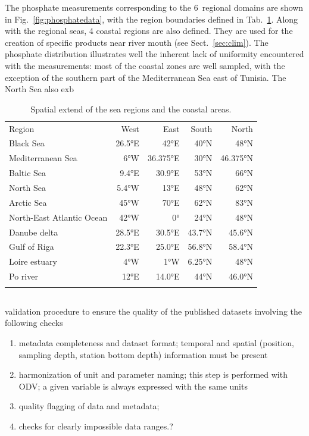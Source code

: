 \documentclass[essd, manuscript]{copernicus}
\begin{document}
The phosphate measurements corresponding to the 6~regional domains are shown in Fig.~\ref{fig:phosphatedata}, with the region boundaries defined in Tab.~\ref{tab:regions}. Along with the regional seas, 4 coastal regions are also defined. They are used for the creation of specific products near river mouth (see Sect.~\ref{sec:clim}). The phosphate distribution illustrates well the inherent lack of uniformity encountered with the measurements: most of the coastal zones are well sampled, with the exception of the southern part of the Mediterranean Sea east of Tunisia. The North Sea also exb 

\begin{table}
\caption{Spatial extend of the sea regions and the coastal areas.\label{tab:regions}}
\begin{tabular}{lrrrr}
\tophline
Region	 					& West		& East		& South 	& North 	\\ 
\middlehline	
Black Sea					& 26.5°E 	& 42°E		& 40°N		& 48°N	 	\\
Mediterranean Sea			& 6°W		& 36.375°E	& 30°N		& 46.375°N	\\
Baltic Sea					& 9.4°E		& 30.9°E	& 53°N		& 66°N		\\
North Sea 					& 5.4°W 	& 13°E		& 48°N		& 62°N		\\
Arctic Sea 					& 45°W 		& 70°E		& 62°N		& 83°N		\\
North-East Atlantic Ocean 	& 42°W		& 0° 		& 24°N		& 48°N		\\
\middlehline	
Danube delta				& 28.5°E	& 30.5°E	& 43.7°N 	& 45.6°N	\\
Gulf of Riga 				& 22.3°E 	& 25.0°E 	& 56.8°N 	& 58.4°N	\\
Loire estuary				& 4°W		& 1°W 		& 6.25°N	& 48°N		\\
Po river					& 12°E		& 14.0°E	& 44°N		& 46.0°N	\\
\bottomhline
\end{tabular}
\end{table}


		

\subsection{}

validation procedure to ensure the quality of the published datasets \citep{Barth2015,Lipizer2021}
involving the following checks
\begin{enumerate}
\item metadata completeness and dataset format; temporal and spatial (position, sampling depth, station bottom depth) information
must be present
\item harmonization of unit and parameter naming; this step is performed with ODV; a given variable is always expressed with the same units
\item quality flagging of data and metadata;
\item checks for clearly impossible data ranges.?
\end{enumerate} 
\end{document}
